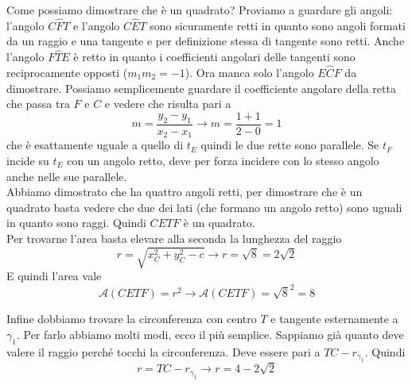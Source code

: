 Come possiamo dimostrare che è un quadrato? Proviamo a guardare gli angoli: l'angolo $C\widehat{F}T$
e l'angolo $C\widehat{E}T$ sono sicuramente retti in quanto sono angoli formati da un raggio e una 
tangente e per definizione stessa di tangente sono retti. Anche l'angolo $F\widehat{T}E$ è retto in
quanto i coefficienti angolari delle tangenti sono reciprocamente opposti ($m_1m_2=-1$). Ora manca
solo l'angolo $E\widehat{C}F$ da dimostrare. Possiamo semplicemente guardare il coefficiente angolare
della retta che passa tra $F$ e $C$ e vedere che risulta pari a 
\begin{equation*}
  m = \frac{y_2-y_1}{x_2-x_1} \rightarrow m= \frac{1+1}{2-0} = 1
\end{equation*}
che è esattamente uguale a quello di $t_E$ quindi le due rette sono parallele. Se $t_F$ incide su 
$t_E$ con un angolo retto, deve per forza incidere con lo stesso angolo anche nelle sue parallele.\\
Abbiamo dimostrato che ha quattro angoli retti, per dimostrare che è un quadrato basta vedere che due
dei lati (che formano un angolo retto) sono uguali in quanto sono raggi. Quindi $CETF$ è un 
quadrato.\\
Per trovarne l'area basta elevare alla seconda la lunghezza del raggio
\begin{equation*}
  r = \sqrt{x_C^2+y_C^2-c} \rightarrow r = \sqrt{8} = 2\sqrt{2}
\end{equation*}
E quindi l'area vale
\begin{equation*}
  \mathscr{A}(CETF) = r^2 \rightarrow \mathscr{A}(CETF) = \sqrt{8}^2 = 8
\end{equation*}

Infine dobbiamo trovare la circonferenza con centro $T$ e tangente esternamente a $\gamma_1$. Per 
farlo abbiamo molti modi, ecco il più semplice. Sappiamo già quanto deve valere il raggio perché 
tocchi la circonferenza. Deve essere pari a $TC-r_{\gamma_1}$. Quindi
\begin{equation*}
  r = TC-r_{\gamma_1} \rightarrow r = 4-2\sqrt{2}
\end{equation*}

